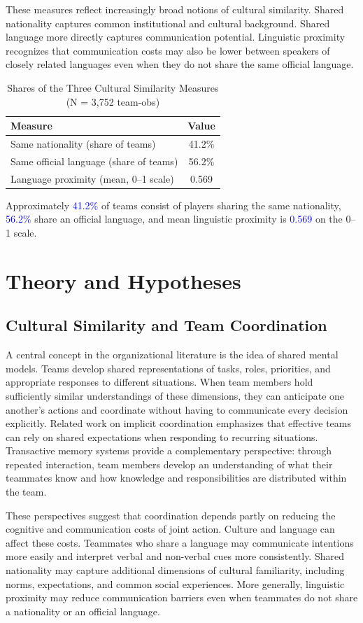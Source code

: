 \documentclass[10pt]{article}
\begin{document}
These measures reflect increasingly broad notions of cultural similarity. Shared nationality captures common institutional and cultural background. Shared language more directly captures communication potential. Linguistic proximity recognizes that communication costs may also be lower between speakers of closely related languages even when they do not share the same official language.

\begin{table}[htbp]
\color{blue}
\centering
\caption{Shares of the Three Cultural Similarity Measures (N = 3,752 team-obs)}
\label{tab:t2}
\begin{tabular}{lc}
\toprule
Measure & Value \\
\midrule
Same nationality (share of teams) & 41.2\% \\
Same official language (share of teams) & 56.2\% \\
Language proximity (mean, 0--1 scale) & 0.569 \\
\bottomrule
\end{tabular}
\end{table}
\FloatBarrier
Approximately \textcolor{blue}{41.2\%} of teams consist of players sharing the same nationality, \textcolor{blue}{56.2\%} share an official language, and mean linguistic proximity is \textcolor{blue}{0.569} on the 0--1 scale.
\section{Theory and Hypotheses}
\subsection{Cultural Similarity and Team Coordination}
A central concept in the organizational literature is the idea of shared mental models. Teams develop shared representations of tasks, roles, priorities, and appropriate responses to different situations. When team members hold sufficiently similar understandings of these dimensions, they can anticipate one another's actions and coordinate without having to communicate every decision explicitly. Related work on implicit coordination emphasizes that effective teams can rely on shared expectations when responding to recurring situations. Transactive memory systems provide a complementary perspective: through repeated interaction, team members develop an understanding of what their teammates know and how knowledge and responsibilities are distributed within the team.

These perspectives suggest that coordination depends partly on reducing the cognitive and communication costs of joint action. Culture and language can affect these costs. Teammates who share a language may communicate intentions more easily and interpret verbal and non-verbal cues more consistently. Shared nationality may capture additional dimensions of cultural familiarity, including norms, expectations, and common social experiences. More generally, linguistic proximity may reduce communication barriers even when teammates do not share a nationality or an official language.
\end{document}
